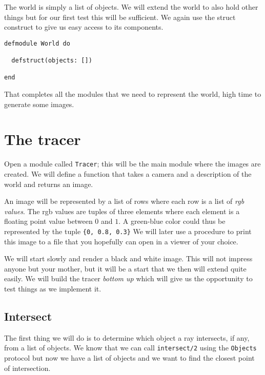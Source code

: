 \documentclass[a4paper,11pt]{article}
\begin{document}
The world is simply a list of objects. We will extend the world to
also hold other things but for our first test this will be
sufficient. We again use the struct construct to give us easy access to its 
components.

\begin{verbatim}
defmodule World do

  defstruct(objects: [])

end
\end{verbatim}

That completes all the modules that we need to represent the world,
high time to generate some images.



\section{The tracer}

Open a module called {\tt Tracer}; this will be the main module where
the images are created. We will define a function that takes a camera
and a description of the world and returns an image.

An image will be represented by a list of rows where each row is a
list of {\em rgb values}. The rgb values are tuples of three elements
where each element is a floating point value between $0$ and $1$. A
green-blue color could thus be represented by the tuple {\tt \{0, 0.8,
  0.3\}} We will later use a procedure to print this image to a file
that you hopefully can open in a viewer of your choice.

We will start slowly and render a black and white image. This will not
impress anyone but your mother, but it will be a start that we then
will extend quite easily. We will build the tracer {\em bottom up}
which will give us the opportunity to test things as we implement
it. 

\subsection*{Intersect}

The first thing we will do is to determine which object a ray
intersects, if any, from a list of objects. We know that we can call
{\tt intersect/2} using the {\tt Objects} protocol but now we have a list
of objects and we want to find the closest point of intersection.
\end{document}
